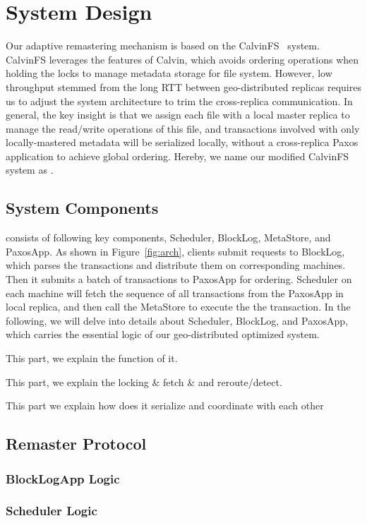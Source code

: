 \section{System Design}

Our adaptive remastering mechanism is based on the CalvinFS~\cite{thomson2015calvinfs} system. CalvinFS leverages the features of Calvin, which avoids ordering operations when holding the locks to manage metadata storage for file system. However, low throughput stemmed from the long RTT between geo-distributed replicas requires us to adjust the system architecture to trim the cross-replica communication. In general, the key insight is that we assign each file with a local master replica to manage the read/write operations of this file, and transactions involved with only locally-mastered metadata will be serialized locally, without a cross-replica Paxos application to achieve global ordering. Hereby, we name our modified CalvinFS system as \name.

\subsection{System Components}
\name{} consists of following key components, \textsf{Scheduler}, \textsf{BlockLog}, \textsf{MetaStore}, and \textsf{PaxosApp}. As shown in Figure~\ref{fig:arch}, clients submit requests to \textsf{BlockLog}, which parses the transactions and distribute them on corresponding machines. Then it submits a batch of transactions to \textsf{PaxosApp} for ordering. \textsf{Scheduler} on each machine will fetch the sequence of all transactions from the PaxosApp in local replica, and then call the \textsf{MetaStore} to execute the the transaction. In the following, we will delve into details about \textsf{Scheduler}, \textsf{BlockLog}, and \textsf{PaxosApp}, which carries the essential logic of our geo-distributed optimized \name{} system.

 This part, we explain the function of it. 

 This part, we explain the locking $\&$ fetch $\&$ and reroute/detect.

 This part we explain how does it serialize and coordinate with each other

\subsection{Remaster Protocol}


\subsubsection{BlockLogApp Logic}

\subsubsection{Scheduler Logic}



